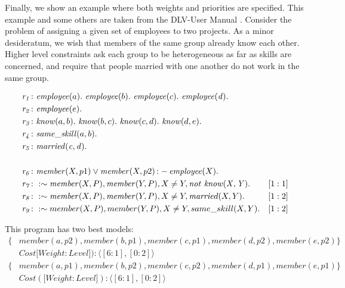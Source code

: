 \documentclass[a4paper, titlepage]{article}
\DeclareMathOperator{\leftimpl}{:-}
\newcommand{\row}[1]{%
  \ensuremath{\it \color{black} #1 \color{black}}%
}
\begin{document}
Finally, we show an example where both weights and 
priorities are specified. This example and some others are 
taken from the DLV-User Manual \cite{brfwilvpg2009}. Consider the 
problem of assigning a given set of employees to two 
projects. As a minor desideratum, we wish that members of 
the same group already know each other. Higher level 
constraints ask each group to be heterogeneous as far as 
skills are concerned, and require that people married with 
one another do not work in the same group.
\begin{exmp}
\begin{align*}
\row{r_1}\colon& \mathit{employee}(a). \ \mathit{employee}(b). \ 
\mathit{employee}(c). \ \mathit{employee(d)}. \ \\
\row{r_2}\colon& \mathit{employee}(e). \\
\row{r_3}\colon& \mathit{know}(a,b). \ \mathit{know}(b,c). \ 
\mathit{know}(c,d). \ \mathit{know}(d,e). \ \\
\row{r_4}\colon& \mathit{same\_skill}(a,b). \\
\row{r_5}\colon& \mathit{married(c,d)}. \\
\\ 
\row{r_6}\colon& \mathit{member}(X,p1) \vee \mathit{member}(X,p2) 
\leftimpl \mathit{employee}(X).\\
\row{r_7}\colon& : \sim \mathit{member}(X,P), \mathit{member}
(Y,P), X \neq Y, \mathit{not} \ \mathit{know(X,Y)}.& 
[1:1] \\
\row{r_8}\colon& : \sim  \mathit{member}(X,P), \mathit{member}
(Y,P), X \neq Y, \mathit{marrie}d(X,Y). & [1:2]\\
\row{r_9}\colon& : \sim member(X,P), member(Y,P), X \neq Y, 
same\_skill(X,Y). & [1:2] 
\end{align*}
\end{exmp}
This program has two best models:
\begin{align*}
\{ & \mathit{member}(a,p2), \mathit{member}(b,p1), 
   \mathit{member}(c,p1), \mathit{member}(d,p2), 
   \mathit{member}(e,p2) \} \\
   & \mathit{Cost} [ \mathit{Weight:Level]}):  \langle 
   [6:1],[0:2] \rangle \\ 
\{ & \mathit{member}(a,p1), \mathit{member}(b,p2), 
   \mathit{member}(c,p2), \mathit{member}(d,p1), 
   \mathit{member}(e,p1) \} \\
   & \mathit{Cost} ([ \mathit{Weight:Level]}):\langle 
   [6:1],[0:2] \rangle
\end{align*}
\end{document}
